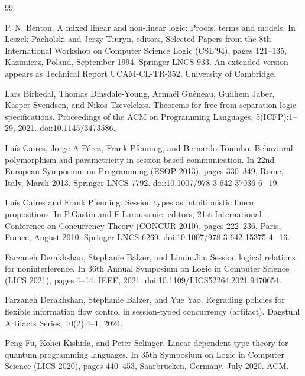 \documentclass[10pt,a4paper]{amsart}
\begin{document}
\begin{thebibliography}{99}
\par\noindent  [9]  P. N. Benton.  A mixed linear and non-linear logic: Proofs, terms and models.  In Leszek Pacholski and Jerzy Tiuryn, editors, Selected Papers from the 8th International Workshop on Computer Science Logic (CSL’94), pages 121–135, Kazimierz, Poland, September 1994. Springer LNCS 933.  An extended version appears as Technical Report UCAM-CL-TR-352, University of Cambridge.  
 
\par\noindent  [10]  Lars Birkedal, Thomas Dinsdale-Young, Armaël Guéneau, Guilhem Jaber, Kasper Svendsen, and Nikos Tzevelekos.  Theorems for free from separation logic specifications.  Proceedings of the ACM on Programming Languages, 5(ICFP):1–29, 2021.  doi:10.1145/3473586.  
 
\par\noindent  [11]  Luís Caires, Jorge A Pérez, Frank Pfenning, and Bernardo Toninho.  Behavioral polymorphism and parametricity in session-based communication.  In 22nd European Symposium on Programming (ESOP 2013), pages 330–349, Rome, Italy, March 2013. Springer LNCS 7792.  doi:10.1007/978-3-642-37036-6\_19.  
 
\par\noindent  [12]  Luís Caires and Frank Pfenning.  Session types as intuitionistic linear propositions.  In P.Gastin and F.Laroussinie, editors, 21st International Conference on Concurrency Theory (CONCUR 2010), pages 222–236, Paris, France, August 2010. Springer LNCS 6269.  doi:10.1007/978-3-642-15375-4\_16.  
 
\par\noindent  [13]  Farzaneh Derakhshan, Stephanie Balzer, and Limin Jia.  Session logical relations for noninterference.  In 36th Annual Symposium on Logic in Computer Science (LICS 2021), pages 1–14. IEEE, 2021.  doi:10.1109/LICS52264.2021.9470654.  
 
\par\noindent  [14]  Farzaneh Derakhshan, Stephanie Balzer, and Yue Yao.  Regrading policies for flexible information flow control in session-typed concurrency (artifact).  Dagstuhl Artifacts Series, 10(2):4–1, 2024.  
 
\par\noindent  [15]  Peng Fu, Kohei Kishida, and Peter Selinger.  Linear dependent type theory for quantum programming languages.  In 35th Symposium on Logic in Computer Science (LICS 2020), pages 440–453, Saarbrücken, Germany, July 2020. ACM.  
 

\end{thebibliography}
\end{document}
